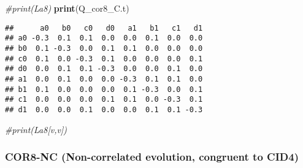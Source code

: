 \documentclass[
]{article}
\newenvironment{Shaded}{\begin{snugshade}}{\end{snugshade}}
\newcommand{\CommentTok}[1]{\textcolor[rgb]{0.56,0.35,0.01}{\textit{#1}}}
\newcommand{\FunctionTok}[1]{\textcolor[rgb]{0.13,0.29,0.53}{\textbf{#1}}}
\newcommand{\NormalTok}[1]{#1}
\begin{document}
\begin{Shaded}
\begin{Highlighting}[]
\CommentTok{\#print(La8)}
\FunctionTok{print}\NormalTok{(Q\_cor8\_C.t)}
\end{Highlighting}
\end{Shaded}

\begin{verbatim}
##      a0   b0   c0   d0   a1   b1   c1   d1
## a0 -0.3  0.1  0.1  0.0  0.0  0.1  0.0  0.0
## b0  0.1 -0.3  0.0  0.1  0.1  0.0  0.0  0.0
## c0  0.1  0.0 -0.3  0.1  0.0  0.0  0.0  0.1
## d0  0.0  0.1  0.1 -0.3  0.0  0.0  0.1  0.0
## a1  0.0  0.1  0.0  0.0 -0.3  0.1  0.1  0.0
## b1  0.1  0.0  0.0  0.0  0.1 -0.3  0.0  0.1
## c1  0.0  0.0  0.0  0.1  0.1  0.0 -0.3  0.1
## d1  0.0  0.0  0.1  0.0  0.0  0.1  0.1 -0.3
\end{verbatim}

\begin{Shaded}
\begin{Highlighting}[]
\CommentTok{\#print(La8[v,v])}
\end{Highlighting}
\end{Shaded}

\hypertarget{cor8-nc-non-correlated-evolution-congruent-to-cid4}{%
\subsubsection{COR8-NC (Non-correlated evolution, congruent to CID4)}\label{cor8-nc-non-correlated-evolution-congruent-to-cid4}}
\end{document}
